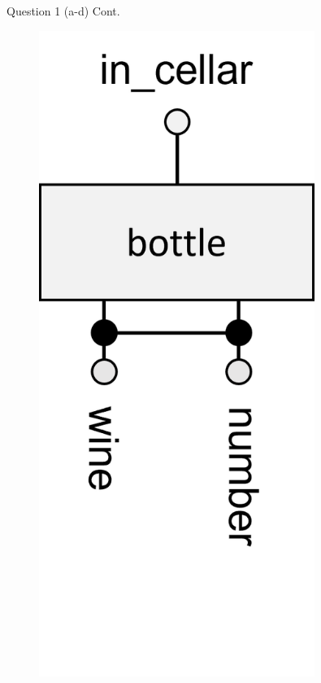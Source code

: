 \begin{frame}[fragile]{Question 1 (a-d) Cont.}
\begin{figure}
\begin{columns}
			\includegraphics[width=0.8\textwidth]{t4/images/bottle_entity_1fk.png}

\end{columns}
\end{figure}
\end{frame}
